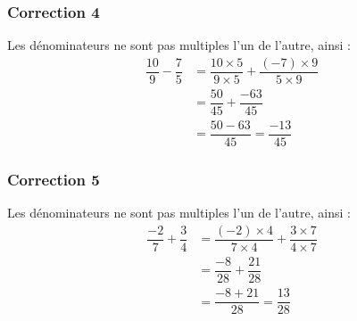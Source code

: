 \documentclass[15pt, mathserif]{beamer}
\begin{document}
\begin{frame}
\vspace{-10mm}
	\frametitle{Correction 4}
Les dénominateurs ne sont pas multiples l'un de l'autre, ainsi : 	\begin{align*}
		\dfrac{10}{9}-\dfrac{7}{5}&=\dfrac{10\times5}{9\times5} + \dfrac{\left(-7\right)\times9}{5\times9}\\[1ex]
		&=\dfrac{50}{45}+\dfrac{-63}{45}\\[1ex]
		&=\dfrac{50-63}{45}=\dfrac{-13}{45}
	\end{align*}
\end{frame}


\begin{frame}
\vspace{-10mm}
	\frametitle{Correction 5}
Les dénominateurs ne sont pas multiples l'un de l'autre, ainsi : 	\begin{align*}
		\dfrac{-2}{7}+\dfrac{3}{4}&=\dfrac{\left(-2\right)\times4}{7\times4} + \dfrac{3\times7}{4\times7}\\[1ex]
		&=\dfrac{-8}{28}+\dfrac{21}{28}\\[1ex]
		&=\dfrac{-8+21}{28}=\dfrac{13}{28}
	\end{align*}
\end{frame}
\end{document}
